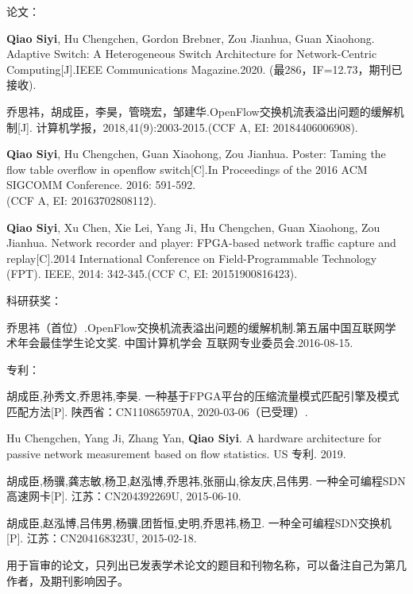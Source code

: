 
{}




\noindent 论文：
\begin{publist}
	\item \textbf{Qiao Siyi}, Hu Chengchen, Gordon Brebner, Zou Jianhua, Guan Xiaohong. Adaptive Switch: A Heterogeneous Switch Architecture for Network-Centric Computing[J].IEEE Communications Magazine.2020.
	(最286，IF=12.73，期刊已接收).
	\item {\hei 乔思祎}，胡成臣，李昊，管晓宏，邹建华.OpenFlow交换机流表溢出问题的缓解机制[J]. 计算机学报，2018,41(9):2003-2015.(CCF A, EI: 20184406006908).
	\item \textbf{Qiao Siyi}, Hu Chengchen, Guan Xiaohong, Zou Jianhua. Poster: Taming the flow table overflow in openflow switch[C].In Proceedings of the 2016 ACM SIGCOMM Conference. 2016: 591-592.\\
	(CCF A, EI: 20163702808112).
	\item \textbf{Qiao Siyi}, Xu Chen, Xie Lei, Yang Ji, Hu Chengchen, Guan Xiaohong, Zou Jianhua. Network recorder and player: FPGA-based network traffic capture and replay[C].2014 International Conference on Field-Programmable Technology (FPT). IEEE, 2014: 342-345.(CCF C, EI: 20151900816423).
\end{publist}

\noindent 科研获奖：
\begin{publist}
	\item {\hei 乔思祎}（首位）.OpenFlow交换机流表溢出问题的缓解机制.第五届中国互联网学术年会最佳学生论文奖. 中国计算机学会 互联网专业委员会.2016-08-15.
\end{publist}

\noindent 专利：
\begin{publist}
	
	\item 胡成臣,孙秀文,{\hei 乔思祎},李昊. 一种基于FPGA平台的压缩流量模式匹配引擎及模式匹配方法[P]. 陕西省：CN110865970A, 2020-03-06（已受理）.
	\item Hu Chengchen, Yang Ji, Zhang Yan, \textbf{Qiao Siyi}. A hardware architecture for passive network measurement based on flow statistics. US 专利. 2019.
	\item 胡成臣,杨骥,龚志敏,杨卫,赵泓博,{\hei 乔思祎},张丽山,徐友庆,吕伟男. 一种全可编程SDN高速网卡[P]. 江苏：CN204392269U, 2015-06-10. 
	\item 胡成臣,赵泓博,吕伟男,杨骥,团哲恒,史明,{\hei 乔思祎},杨卫. 一种全可编程SDN交换机[P]. 江苏：CN204168323U, 2015-02-18.
\end{publist}






\vspace{\baselineskip}
{\color{red} 用于盲审的论文，只列出已发表学术论文的题目和刊物名称，可以备注自己为第几作者，及期刊影响因子。}

\clearpage{\pagestyle{empty}\cleardoublepage}%

